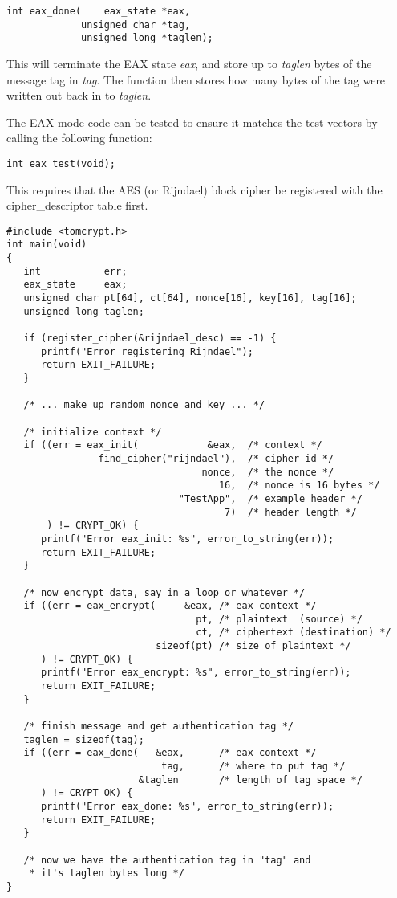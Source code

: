 \documentclass[synpaper]{book}
\begin{document}
\begin{verbatim}
int eax_done(    eax_state *eax,
             unsigned char *tag,
             unsigned long *taglen);
\end{verbatim}
This will terminate the EAX state \textit{eax}, and store up to \textit{taglen} bytes of the message tag in \textit{tag}.  The function
then stores how many bytes of the tag were written out back in to \textit{taglen}.

The EAX mode code can be tested to ensure it matches the test vectors by calling the following function:
\begin{verbatim}
int eax_test(void);
\end{verbatim}
This requires that the AES (or Rijndael) block cipher be registered with the cipher\_descriptor table first.

\begin{verbatim}
#include <tomcrypt.h>
int main(void)
{
   int           err;
   eax_state     eax;
   unsigned char pt[64], ct[64], nonce[16], key[16], tag[16];
   unsigned long taglen;

   if (register_cipher(&rijndael_desc) == -1) {
      printf("Error registering Rijndael");
      return EXIT_FAILURE;
   }

   /* ... make up random nonce and key ... */

   /* initialize context */
   if ((err = eax_init(            &eax,  /* context */
                find_cipher("rijndael"),  /* cipher id */
                                  nonce,  /* the nonce */
                                     16,  /* nonce is 16 bytes */
                              "TestApp",  /* example header */
                                      7)  /* header length */
       ) != CRYPT_OK) {
      printf("Error eax_init: %s", error_to_string(err));
      return EXIT_FAILURE;
   }

   /* now encrypt data, say in a loop or whatever */
   if ((err = eax_encrypt(     &eax, /* eax context */
                                 pt, /* plaintext  (source) */
                                 ct, /* ciphertext (destination) */
                          sizeof(pt) /* size of plaintext */
      ) != CRYPT_OK) {
      printf("Error eax_encrypt: %s", error_to_string(err));
      return EXIT_FAILURE;
   }

   /* finish message and get authentication tag */
   taglen = sizeof(tag);
   if ((err = eax_done(   &eax,      /* eax context */
                           tag,      /* where to put tag */
                       &taglen       /* length of tag space */
      ) != CRYPT_OK) {
      printf("Error eax_done: %s", error_to_string(err));
      return EXIT_FAILURE;
   }

   /* now we have the authentication tag in "tag" and
    * it's taglen bytes long */
}
\end{verbatim}
\end{document}
